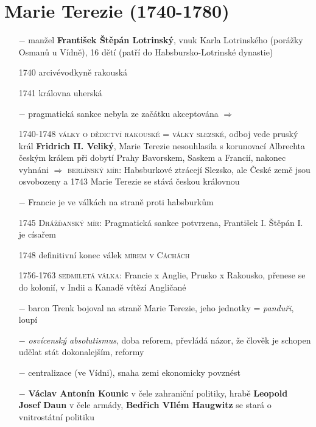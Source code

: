 \documentclass{article}
\begin{document}
\section*{Marie Terezie (1740-1780)}
\begin{itemize}
    \vspace{-0.5em}
    \setlength\itemsep{0.15em}
    \item[$-$] manžel \textbf{František Štěpán Lotrinský}, vnuk Karla Lotrinského (porážky Osmanů u Vídně), 16 dětí (patří do Habsbursko-Lotrinské dynastie)
    \item[1740] arcivévodkyně rakouská
    \item[1741] královna uherská
    \item[$-$] pragmatická sankce nebyla ze začátku akceptována $\Rightarrow$
    \item[1740-1748] \textsc{války o dědictví rakouské} = \textsc{války slezské}, odboj vede pruský král \textbf{Fridrich II. Veliký}, Marie Terezie nesouhlasila s korunovací Albrechta českým králem při dobytí Prahy Bavorskem, Saskem a Francií, nakonec vyhnáni $\Rightarrow$ \textsc{berlínský mír}: Habsburkové ztrácejí Slezsko, ale České země jsou osvobozeny a 1743 Marie Terezie se stává českou královnou
    \item[$-$] Francie je ve válkách na straně proti habsburkům
    \item[1745] \textsc{Drážďanský mír}: Pragmatická sankce potvrzena, František I. Štěpán I. je císařem
    \item[1748] definitivní konec válek \textsc{mírem v Cáchách}
    \item[1756-1763] \textsc{sedmiletá válka}: Francie x Anglie, Prusko x Rakousko, přenese se do kolonií, v Indii a Kanadě vítězí Angličané
    \item[$-$] baron Trenk bojoval na straně Marie Terezie, jeho jednotky = \textit{panduři}, loupí
    \item[$-$] \textit{osvícenský absolutismus}, doba reforem, převládá názor, že člověk je schopen udělat stát dokonalejším, reformy
    \item[$-$] centralizace (ve Vídni), snaha zemi ekonomicky povznést
    \item[$-$] \textbf{Václav Antonín Kounic} v čele zahraniční politiky, hrabě \textbf{Leopold Josef Daun} v čele armády, \textbf{Bedřich VIlém Haugwitz} se stará o vnitrostátní politiku
\end{itemize}
\end{document}
